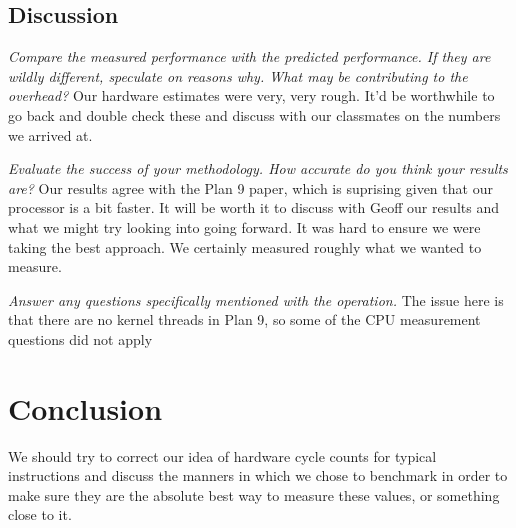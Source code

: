 \documentclass[letterpaper,twocolumn,10pt]{article}
\begin{document}
\subsection{Discussion}
\textit{Compare the measured performance with the predicted performance. If they are wildly different, speculate on reasons why. What may be contributing to the overhead?}
    Our hardware estimates were very, very rough. It'd be worthwhile to go back and double check these and discuss with our classmates on the numbers we arrived at.

    
    \textit{Evaluate the success of your methodology. How accurate do you think your results are?}
    Our results agree with the Plan 9 paper, which is suprising given that our processor is a bit faster. It will be worth it to discuss with Geoff our results and what we might try looking into going forward. It was hard to ensure we were taking the best approach. We certainly measured roughly what we wanted to measure.

\textit{Answer any questions specifically mentioned with the operation.}
The issue here is that there are no kernel threads in Plan 9, so some of the CPU measurement questions did not apply

\section{Conclusion}

We should try to correct our idea of hardware cycle counts for typical instructions and discuss the manners in which we chose to benchmark in order to make sure they are the absolute best way to measure these values, or something close to it. 

{\normalsize 
}


\theendnotes
\end{document}
